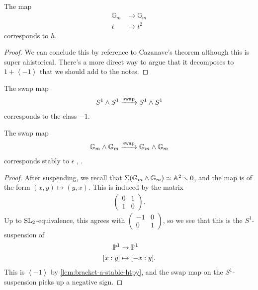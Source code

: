 \documentclass[11pt,openany]{book}
\let\smashprod\wedge
\begin{document}
\begin{proposition} The map
\begin{align*}
    \mathbb{G}_m &\to \mathbb{G}_m \\
    t &\mapsto t^2
\end{align*}
corresponds to $h$.
\end{proposition}
\begin{proof} We can conclude this by reference to Cazanave's theorem although this is super ahistorical. There's a more direct way to argue that it decomposes to $1 + \left\langle -1 \right\rangle$ that we should add to the notes.
\end{proof}





\begin{proposition} The swap map
\begin{align*}
    S^1 \smashprod S^1 \xto{\text{swap}} S^1 \smashprod S^1
\end{align*}
corresponds to the class $-1$.
\end{proposition}



\begin{proposition} The swap map
\begin{align*}
    \mathbb{G}_m \smashprod \mathbb{G}_m \xto{\text{swap}} \mathbb{G}_m \smashprod \mathbb{G}_m
\end{align*}
corresponds stably to $\epsilon$ \cite[3.43]{Morel}, \cite[6.1.1(2)]{Morel-trieste}.
\end{proposition}
\begin{proof} After suspending, we recall that $\Sigma (\mathbb{G}_m \smashprod \mathbb{G}_m) \simeq \A^2\minus 0$, and the map is of the form $(x,y) \mapsto (y,x)$. This is induced by the matrix
\begin{align*}
    \begin{pmatrix} 0 & 1 \\ 1 & 0 \end{pmatrix}.
\end{align*}
Up to $\SL_2$-equivalence, this agrees with $\begin{pmatrix} -1 & 0 \\ 0 & 1 \end{pmatrix}$, so we see that this is the $S^1$-suspension of
\begin{align*}
    \P^1 &\to \P^1 \\
    [x:y] &\mapsto [-x:y].
\end{align*}
This is $\left\langle -1 \right\rangle$ by \autoref{lem:bracket-a-stable-htpy}, and the swap map on the $S^1$-suspension picks up a negative sign.
\end{proof}
\end{document}
